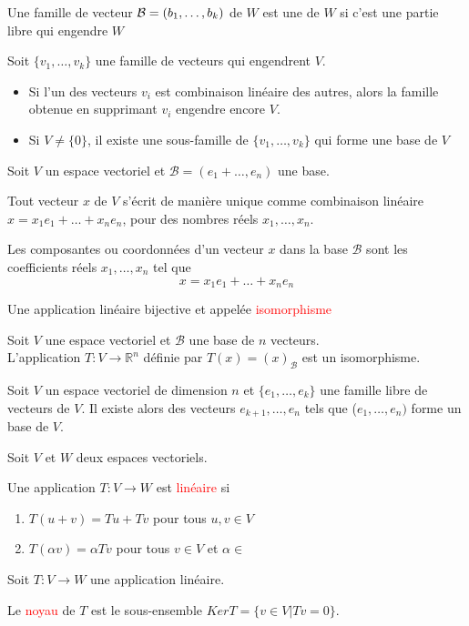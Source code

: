 \begin{definition}
    Une famille  de vecteur $\mathcal{B} = (b_1, \dots, b_k)$ de $W$ est une  de $W$ si c'est une partie libre qui engendre $W$ 
\end{definition}
Soit $\{v_1, \dots, v_k\}$ une famille de vecteurs qui engendrent $V$.
\begin{theoreme}
    \begin{itemize}
        \item Si l'un des vecteurs $v_i$ est combinaison linéaire des autres, alors la famille obtenue en supprimant $v_i$ engendre encore $V$.
        \item Si $V \neq \{0\}$, il existe une sous-famille de $\{v_1, \dots, v_k\}$ qui forme une base de $V$
    \end{itemize}
\end{theoreme}
Soit $V$ un espace vectoriel et $\mathcal{B} = (e_1 + \dots, e_n)$ une base.
\begin{theoreme}
    Tout vecteur $x$ de $V$ s'écrit de manière unique comme combinaison linéaire $x = x_1e_1 + \dots + x_ne_n$, pour des nombres réels $x_1, \dots, x_n$.
\end{theoreme}
\begin{definition}
    Les composantes ou coordonnées d'un vecteur $x$ dans la base $\mathcal{B}$ sont les coefficients réels $x_1, \dots, x_n$ tel que
    \[x = x_1e_1 + \dots + x_ne_n\]
\end{definition}
\begin{definition}
    Une application linéaire bijective et appelée \textcolor{red}{isomorphisme}
\end{definition}
\begin{theoreme}
    Soit $V$ une espace vectoriel et $\mathcal{B}$ une base de $n$ vecteurs. \\
    L'application $T : V \to \mathbb{R}^n$ définie par $T(x) = (x)_{\mathcal{B}}$ est un isomorphisme.
\end{theoreme}
\begin{theoreme}
    Soit $V$ un espace vectoriel de dimension $n$ et $\{e_1, \dots, e_k\}$ une famille libre de vecteurs de $V$. Il existe alors des vecteurs $e_{k+1}, \dots, e_n$ tels que ($e_1, \dots, e_n)$ forme un base de $V$.
\end{theoreme}
Soit $V$ et $W$ deux espaces vectoriels.
\begin{definition}
    Une application $T : V \to W$ est \textcolor{red}{linéaire} si
    \begin{enumerate}
        \item $T(u + v) = Tu + Tv$ pour tous $u, v \in V$
        \item $T(\alpha v) = \alpha Tv$ pour tous $v \in V$ et $\alpha \in $\R
    \end{enumerate}
\end{definition}
Soit $T: V \to W$ une application linéaire.
\begin{definition}
    Le \textcolor{red}{noyau} de $T$ est le sous-ensemble $Ker T = \{v \in V | Tv = 0\}$.
\end{definition}

